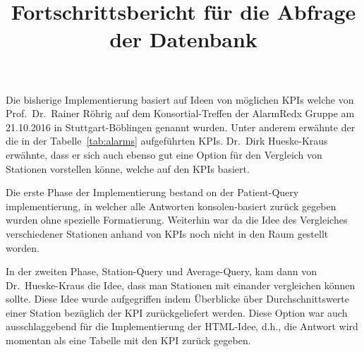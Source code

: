 \documentclass{scrartcl}
\begin{document}
\title{Fortschrittsbericht für die Abfrage der Datenbank}
\maketitle
Die bisherige Implementierung basiert auf Ideen von möglichen KPIs welche von Prof.~Dr.~Rainer Röhrig auf dem Konsortial-Treffen der AlarmRedx Gruppe am 21.10.2016 in Stuttgart-Böblingen genannt wurden. Unter anderem erwähnte der die in der Tabelle~\ref{tab:alarms} aufgeführten KPIs. Dr.~Dirk Hueske-Kraus erwähnte, dass er sich auch ebenso gut eine Option für den Vergleich von Stationen vorstellen könne, welche auf den KPIs basiert.

Die erste Phase der Implementierung bestand on der Patient-Query implementierung, in welcher alle Antworten konsolen-basiert zurück gegeben wurden ohne spezielle Formatierung. Weiterhin war da die Idee des Vergleiches verschiedener Stationen anhand von KPIs noch nicht in den Raum gestellt worden.

In der zweiten Phase, Station-Query und Average-Query, kam dann von Dr.~Hueske-Kraus die Idee, dass man Stationen mit einander vergleichen können sollte. Diese Idee wurde aufgegriffen indem Überblicke über Durchschnittswerte einer Station bezüglich der KPI zurückgeliefert werden. Diese Option war auch ausschlaggebend für die Implementierung der HTML-Idee, d.h., die Antwort wird momentan als eine Tabelle mit den KPI zurück gegeben.
\end{document}
